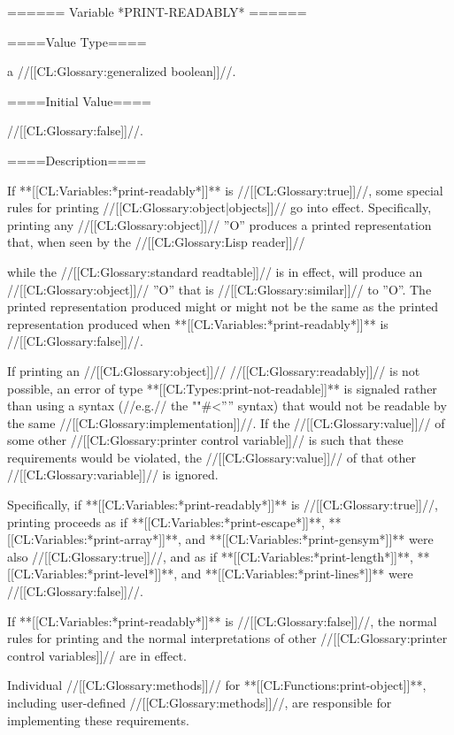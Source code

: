 ====== Variable *PRINT-READABLY* ======

====Value Type====

a //[[CL:Glossary:generalized boolean]]//.

====Initial Value====

//[[CL:Glossary:false]]//.

====Description====

If **[[CL:Variables:*print-readably*]]** is //[[CL:Glossary:true]]//, some special rules for printing //[[CL:Glossary:object|objects]]// go into effect. Specifically, printing any //[[CL:Glossary:object]]// ''O'' produces a printed representation that, when seen by the //[[CL:Glossary:Lisp reader]]//

while the //[[CL:Glossary:standard readtable]]// is in effect, will produce an //[[CL:Glossary:object]]// ''O'' that is //[[CL:Glossary:similar]]// to ''O''. The printed representation produced might or might not be the same as the printed representation produced when **[[CL:Variables:*print-readably*]]** is //[[CL:Glossary:false]]//.

If printing an //[[CL:Glossary:object]]// //[[CL:Glossary:readably]]// is not possible, an error of type **[[CL:Types:print-not-readable]]** is signaled rather than using a syntax (//e.g.// the ""#<'''' syntax) that would not be readable by the same //[[CL:Glossary:implementation]]//. If the //[[CL:Glossary:value]]// of some other //[[CL:Glossary:printer control variable]]// is such that these requirements would be violated, the //[[CL:Glossary:value]]// of that other //[[CL:Glossary:variable]]// is ignored.

Specifically, if **[[CL:Variables:*print-readably*]]** is //[[CL:Glossary:true]]//, printing proceeds as if **[[CL:Variables:*print-escape*]]**, **[[CL:Variables:*print-array*]]**, and **[[CL:Variables:*print-gensym*]]** were also //[[CL:Glossary:true]]//, and as if **[[CL:Variables:*print-length*]]**, **[[CL:Variables:*print-level*]]**, and **[[CL:Variables:*print-lines*]]** were //[[CL:Glossary:false]]//.

If **[[CL:Variables:*print-readably*]]** is //[[CL:Glossary:false]]//, the normal rules for printing and the normal interpretations of other //[[CL:Glossary:printer control variables]]// are in effect.

Individual //[[CL:Glossary:methods]]// for **[[CL:Functions:print-object]]**, including user-defined //[[CL:Glossary:methods]]//, are responsible for implementing these requirements.

